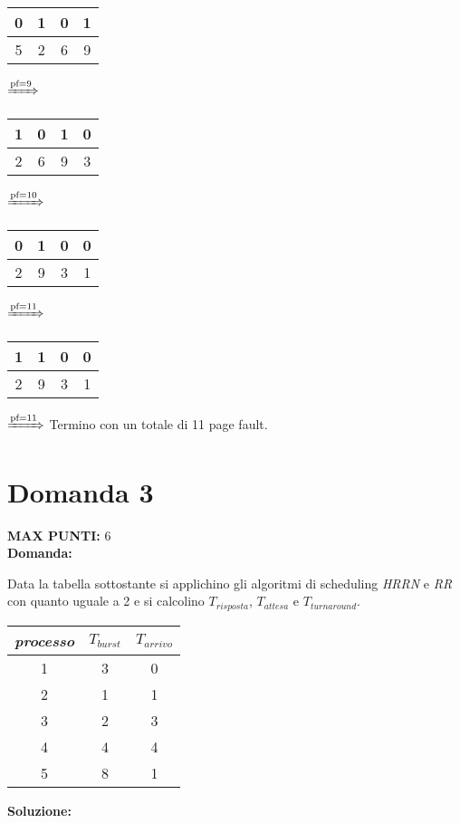 \documentclass{article}
\begin{document}
\begin{enumerate}
      \begin{tabular}{|c|c|c|c|}
         \hline
         0 & 1 & 0 & 1\\
         \hline
         5 & 2 & 6 & 9\\
         \hline
      \end{tabular}
      $\xRightarrow{\text{pf}=9}$
      \begin{tabular}{|c|c|c|c|}
         \hline
         1 & 0 & 1 & 0\\
         \hline
         2 & 6 & 9 & 3\\
         \hline
      \end{tabular}
      $\xRightarrow{\text{pf}=10}$
      \begin{tabular}{|c|c|c|c|}
         \hline
         0 & 1 & 0 & 0\\
         \hline
         2 & 9 & 3 & 1\\
         \hline
      \end{tabular}
      $\xRightarrow{\text{pf}=11}$
      \begin{tabular}{|c|c|c|c|}
         \hline
         1 & 1 & 0 & 0\\
         \hline
         2 & 9 & 3 & 1\\
         \hline
      \end{tabular}
      $\xRightarrow{\text{pf}=11}$
      Termino con un totale di 11 page fault.
   \end{enumerate}
   \section*{Domanda 3}
   \textbf{MAX PUNTI:} 6\\
   \textbf{Domanda:}


   Data la tabella sottostante si applichino gli algoritmi di scheduling \emph{HRRN} e \emph{RR} con quanto uguale a 2 e si calcolino $T_{risposta}$, $T_{attesa}$ e $T_{turnaround}$.
   \begin{center}
      \begin{tabular}{|c|c|c|}
         \hline
         \emph{processo} & $T_{burst}$ & $T_{arrivo}$\\
         \hline
         1 & 3 & 0\\
         \hline
         2 & 1 & 1\\
         \hline
         3 & 2 & 3\\
         \hline
         4 & 4 & 4\\
         \hline
         5 & 8 & 1\\
         \hline
      \end{tabular}
   \end{center}
   \textbf{Soluzione:}
\end{document}
